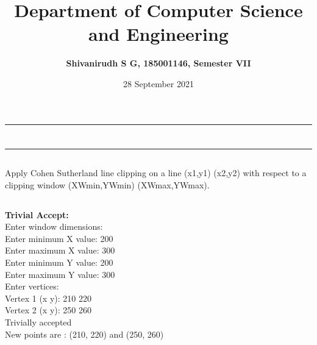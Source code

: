 \documentclass[9pt,letterpaper]{article}
\title{\textbf{Department of Computer Science and Engineering}}
\author{\textbf{Shivanirudh S G, 185001146, Semester VII }}
\date{28 September 2021}
\begin{document}
\maketitle
\hrule
\section*{}
\hrule 
\bigskip\bigskip

\subsection*{}

\subsection*{}
\begin{flushleft}
    Apply Cohen Sutherland line clipping on a line (x1,y1) (x2,y2) with respect to a clipping window (XWmin,YWmin) (XWmax,YWmax). 
\end{flushleft}

\subsection*{}
\begin{flushleft}




\end{flushleft}
\newpage
\subsection*{}
\textbf{Trivial Accept:}\\

Enter window dimensions:  \\
Enter minimum X value: 200 \\
Enter maximum X value: 300 \\
Enter minimum Y value: 200 \\
Enter maximum Y value: 300 \\

Enter vertices:  \\
Vertex 1 (x y): 210 220 \\
Vertex 2 (x y): 250 260 \\
Trivially accepted \\
New points are : (210, 220) and (250, 260) \\
\end{document}
